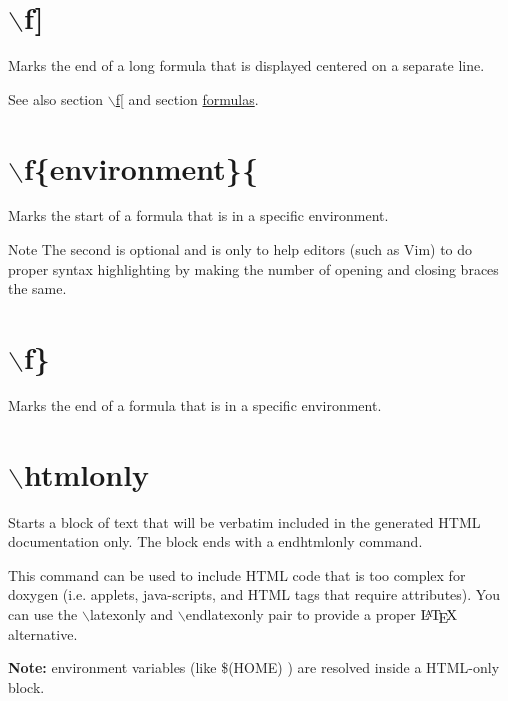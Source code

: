  \hypertarget{commands_cmdfbrclose}{}\section{$\backslash$f\mbox{]}}\label{commands_cmdfbrclose}
\index{\f]@{$\backslash$f]}}

Marks the end of a long formula that is displayed centered on a separate line. \begin{DoxySeeAlso}{See also}
section \hyperlink{commands_cmdfbropen}{$\backslash$f\mbox{[}} and section \hyperlink{formulas}{formulas}.
\end{DoxySeeAlso}


 \hypertarget{commands_cmdfcurlyopen}{}\section{$\backslash$f\{environment\}\{}\label{commands_cmdfcurlyopen}
Marks the start of a formula that is in a specific environment. \begin{DoxyNote}{Note}
The second is optional and is only to help editors (such as Vim) to do proper syntax highlighting by making the number of opening and closing braces the same.
\end{DoxyNote}


 \hypertarget{commands_cmdfcurlyclose}{}\section{$\backslash$f\}}\label{commands_cmdfcurlyclose}
Marks the end of a formula that is in a specific environment.



 \hypertarget{commands_cmdhtmlonly}{}\section{$\backslash$htmlonly}\label{commands_cmdhtmlonly}
 Starts a block of text that will be verbatim included in the generated HTML documentation only. The block ends with a endhtmlonly command.

This command can be used to include HTML code that is too complex for doxygen (i.e. applets, java-\/scripts, and HTML tags that require attributes). You can use the $\backslash$latexonly and $\backslash$endlatexonly pair to provide a proper $\mbox{\LaTeX}$ alternative.

{\bfseries Note:} environment variables (like \$(HOME) ) are resolved inside a HTML-\/only block.

